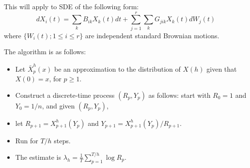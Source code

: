 \documentclass{amsart}
\begin{document}
This will apply to SDE of the following form:
\begin{equation}
  dX_i(t) = \sum_k B_{ik} X_k(t) dt + \sum_{j=1}^r \sum_k G_{jik} X_k(t) dW_j(t)
\end{equation}
where $\{W_i(t); 1 \le i \le r \}$ are independent standard Brownian motions.

The algorithm is as follows:
\begin{itemize}
    \item Let $\bar X^h_p(x)$ be an approximation to the distribution of $X(h)$ given that $X(0)=x$, for $p \ge 1$.
    \item Construct a discrete-time process $(R_p,Y_p)$ as follows: start with $R_0=1$ and $Y_0 = 1/n$, 
        and given $(R_p,Y_p)$,
    \item let $R_{p+1} = X^h_{p+1}(Y_p)$ and $Y_{p+1} = X^h_{p+1}(Y_p) / R_{p+1}$.
    \item Run for $T/h$ steps.
    \item The estimate is $\lambda_h = \frac1T \sum_{p=1}^{T/h} \log R_p$.
\end{itemize}
\end{document}
